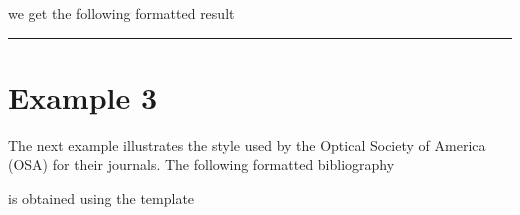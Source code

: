 \documentclass[letterpaper,10pt,english]{sphinxmanual}
\begin{document}
we get the following formatted result

\noindent{}


\bigskip\hrule\bigskip



\section{Example 3}
\label{\detokenize{examples:example-3}}
The next example illustrates the style used by the Optical Society of America (OSA) for their journals. The following formatted bibliography

\noindent{}

is obtained using the template
\end{document}

